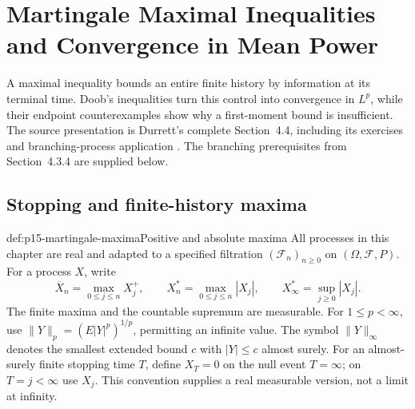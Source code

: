 \chapter{Martingale Maximal Inequalities and Convergence in Mean Power}
\label{sec:p15-martingale-maximal-inequalities}

A maximal inequality bounds an entire finite history by information at
its terminal time. Doob's inequalities turn this control into convergence
in \(L^p\), while their endpoint counterexamples show why a first-moment
bound is insufficient. The source presentation is Durrett's complete
Section~4.4, including its exercises and branching-process application
\cite[pp.~235--239]{DurrettPTEAuthor2019}.
The branching prerequisites from Section~4.3.4 are supplied below.

\section{Stopping and finite-history maxima}
\label{sec:p15-maximal-stopping}

\begin{hbdefinition}{def:p15-martingale-maxima}{Positive and absolute maxima}
All processes in this chapter are real and adapted to a specified
filtration \((\mathcal F_n)_{n\geq0}\) on \((\Omega,\mathcal F,P)\).
For a process \(X\), write
\[
  \overline X_n=\max_{0\leq j\leq n}X_j^+,\qquad
  X_n^*=\max_{0\leq j\leq n}|X_j|,\qquad
  X_\infty^*=\sup_{j\geq0}|X_j|.
\]
The finite maxima and the countable supremum are measurable.
For \(1\leq p<\infty\), use
\(\|Y\|_p=(E|Y|^p)^{1/p}\), permitting an infinite value.
The symbol \(\|Y\|_\infty\) denotes the smallest extended bound \(c\)
with \(|Y|\leq c\) almost surely.
For an almost-surely finite stopping time \(T\), define \(X_T=0\)
on the null event \(T=\infty\); on \(T=j<\infty\) use \(X_j\).
This convention supplies a real measurable version, not a limit at infinity.
\end{hbdefinition}

